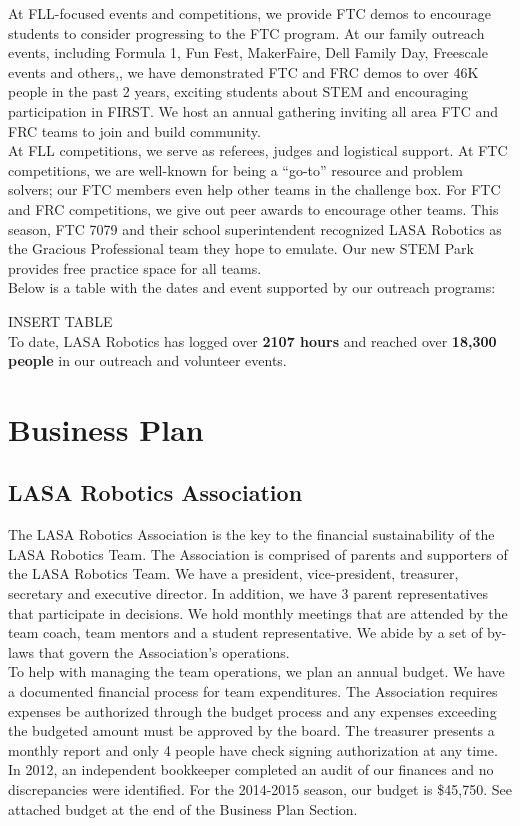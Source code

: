 At FLL-focused events and competitions, we provide FTC demos to encourage students to consider progressing to the FTC program. At our family outreach events, including Formula 1, Fun Fest, MakerFaire, Dell Family Day, Freescale events and others,, we have demonstrated  FTC and FRC demos to over 46K people in the past 2 years, exciting students about STEM and encouraging participation in FIRST. We host an annual gathering inviting all area FTC and FRC teams to join and build community.\\

At FLL competitions, we serve as referees, judges and logistical support. At FTC competitions, we are well-known for being a “go-to” resource and problem solvers; our FTC members even help other teams in the challenge box. For FTC and FRC competitions, we give out peer awards to encourage other teams. This season, FTC 7079 and their school superintendent recognized LASA Robotics as the Gracious Professional team they hope to emulate. Our new STEM Park provides free practice space for all teams.\\

Below is a table with the dates and event supported by our outreach programs:

INSERT TABLE\\

To date, LASA Robotics has logged over {\bf 2107 hours} and reached over {\bf 18,300 people} in our outreach and volunteer events.

\section{Business Plan}
\subsection{LASA Robotics Association}
The LASA Robotics Association is the key to the financial sustainability of the LASA Robotics Team.  The Association is comprised of parents and supporters of the LASA Robotics Team.   We have a president, vice-president, treasurer, secretary and executive director.  In addition, we have 3 parent representatives that participate in decisions.  We hold monthly meetings that are attended by the team coach, team mentors and a student representative. We abide by a set of by-laws that govern the Association’s operations.\\

To help with managing the team operations, we plan an annual budget. We have a documented financial process for team expenditures. The Association requires expenses be authorized through the budget process and any expenses exceeding the budgeted amount must be approved by the board. The treasurer presents a monthly report and only 4 people have check signing authorization at any time. In 2012, an independent bookkeeper completed an audit of our finances and no discrepancies were identified. For the 2014-2015 season, our budget is \$45,750.  See attached budget at the end of the Business Plan Section.\\

